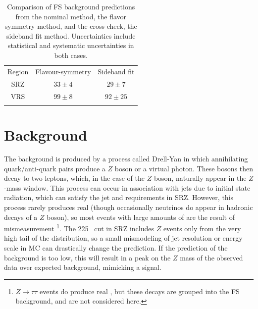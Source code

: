 \begin{table}[h]
\centering

\begin{tabular}{ccc}
\noalign{\smallskip}\hline\noalign{\smallskip}
Region  & Flavour-symmetry  & Sideband fit  \\
\noalign{\smallskip}\hline\hline\noalign{\smallskip}
SRZ & $33 \pm 4$   &  $29 \pm 7$  \\ [+0.05cm]
VRS & $99\pm8$        &  $92 \pm 25$  \\ [+0.05cm]
\noalign{\smallskip}\hline\hline
\end{tabular}
\caption{ Comparison of \ac{FS} background predictions from the nominal method, the flavor symmetry method, and the cross-check, the sideband fit method. Uncertainties include statistical and systematic uncertainties in both cases. }
\label{tab:fs_comparison}
\end{table}


\section{\dyjets Background}
\label{sec:bg-z}

The \dyjets background is produced by a process called Drell-Yan in which annihilating quark/anti-quark pairs produce a $Z$ boson or a virtual photon. These bosons then decay to two leptons, which, in the case of the $Z$ boson, naturally appear in the $Z$-mass window. This process can occur in association with jets due to initial state radiation, which can satisfy the jet and \HT requirements in SRZ. However, this process rarely produces real \met (though occasionally neutrinos do appear in hadronic decays of a $Z$ boson), so most events with large amounts of \met are the result of mismeasurement \footnote{$Z\rightarrow\tau\tau$ events do produce real \met, but these decays are grouped into the \ac{FS} background, and are not considered here.}. The 225 \gev~\met cut in SRZ includes $Z$ events only from the very high tail of the \met distribution, so a small mismodeling of jet resolution or energy scale in \ac{MC} can drastically change the prediction. If the prediction of the \dyjets background is too low, this will result in a peak on the $Z$ mass of the observed data over expected background, mimicking a signal. 

